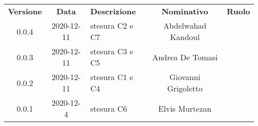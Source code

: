{
    \renewcommand{\arraystretch}{1.5}
    \centering
    \begin{longtable}{ c c  C{4cm}  c  c }
        \rowcolor{\primaryColor}
        \textcolor{\secondaryColor}{
        \textbf{Versione}}     & \textcolor{\secondaryColor}{\textbf{Data}}       & \textcolor{\secondaryColor}
        {\textbf{Descrizione}} & \textcolor{\secondaryColor}{\textbf{Nominativo}} & \textcolor{\secondaryColor}{\textbf{Ruolo}}                          \\


		0.0.4                  & 2020-12-11                                       & stesura C2 e C7                     & Abdelwahad Kandoul & \redattore{}    \\
        0.0.3                  & 2020-12-11                                       & stesura C3 e C5    					& Andrea De Tomasi & \redattore{}    \\
        0.0.2                  & 2020-12-11                                       & stesura C1 e C4   					& Giovanni Grigoletto& \redattore{} \\        
        0.0.1                  & 2020-12-4                                       & stesura C6 & Elvis Murtezan & \redattore{} \\
    \end{longtable}
}
